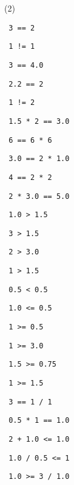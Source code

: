 \begin{exercise}

\begin{sltasks}(2)
  \task
  \begin{items}
    \item \texttt{ 3 == 2 }
    \item \texttt{ 1 != 1 }
    \item \texttt{ 3 == 4.0 }
    \item \texttt{ 2.2 == 2 }
    \item \texttt{ 1 != 2 }
  \end{items}
  \task
  \begin{items}
    \item \texttt{ 1.5 * 2 == 3.0 }
    \item \texttt{ 6 == 6 * 6 }
    \item \texttt{ 3.0 == 2 * 1.0 }
    \item \texttt{ 4 == 2 * 2 }
    \item \texttt{ 2 * 3.0 == 5.0 }
  \end{items}
  \task
  \begin{items}
    \item \texttt{ 1.0 > 1.5 }
    \item \texttt{ 3 > 1.5 }
    \item \texttt{ 2 > 3.0 }
    \item \texttt{ 1 > 1.5 }
    \item \texttt{ 0.5 < 0.5 }
  \end{items}
  \task
  \begin{items}
    \item \texttt{ 1.0 <= 0.5 }
    \item \texttt{ 1 >= 0.5 }
    \item \texttt{ 1 >= 3.0 }
    \item \texttt{ 1.5 >= 0.75 }
    \item \texttt{ 1 >= 1.5 }
  \end{items}
  \task
  \begin{items}
    \item \texttt{ 3 == 1 / 1 }
    \item \texttt{ 0.5 * 1 == 1.0 }
    \item \texttt{ 2 + 1.0 <= 1.0 }
    \item \texttt{ 1.0 / 0.5 <= 1 }
    \item \texttt{ 1.0 >= 3 / 1.0 }
  \end{items}
  \task
  \begin{items}

\end{items}
\end{sltasks}
\end{exercise}
